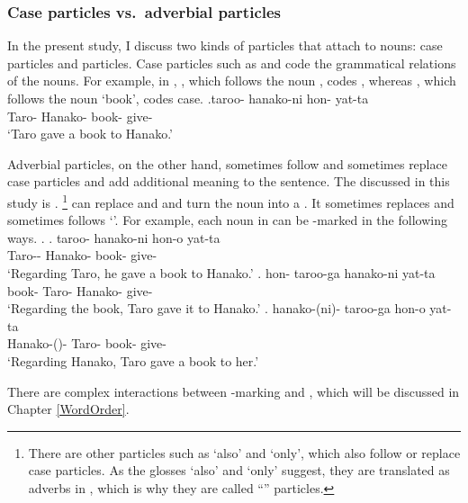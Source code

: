 \subsubsection{Case particles vs.~adverbial particles}

In the present study,
I discuss two kinds of particles that attach to nouns:
case particles and  particles.
Case particles such as  and 
code the grammatical relations of the nouns.
For example, in \Next,
, which follows the noun , codes ,
whereas , which follows the noun  `book', codes  case.
%
\exg.\label{ExShibatani90257}taroo- hanako-ni hon- yat-ta \\
        Taro- Hanako- book- give- \\
        `Taro gave a book to Hanako.'
  \hfill{\cite[257]{shibatani90}}


Adverbial particles, on the other hand,
sometimes follow and sometimes replace case particles
and add additional meaning to the sentence.
The  discussed in this study is .%
 \footnote{
 There are other  particles such as  `also' and  `only',
 which also follow or replace case particles.
 As the glosses `also' and `only' suggest,
 they are translated as adverbs in ,
 which is why they are called ``'' particles.
 }
 can replace  and  and turn the noun into a .
It sometimes replaces and sometimes follows  `'.
For example,
each noun in \Last can be -marked in the following ways.
%
\ex. \ag. taroo- hanako-ni hon-o yat-ta \\
        Taro-- Hanako- book- give- \\
        `Regarding Taro, he gave a book to Hanako.'
 \bg. hon- taroo-{ga} hanako-ni yat-ta \\
      book- Taro- Hanako- give- \\
        `Regarding the book, Taro gave it to Hanako.'
 \bg. hanako-(ni)- taroo-{ga} hon-o yat-ta \\
      Hanako-()- Taro- book- give- \\
        `Regarding Hanako, Taro gave a book to her.'

There are complex interactions between -marking and  \cite[e.g.,][]{kuroda79},
which will be discussed in Chapter \ref{WordOrder}.


